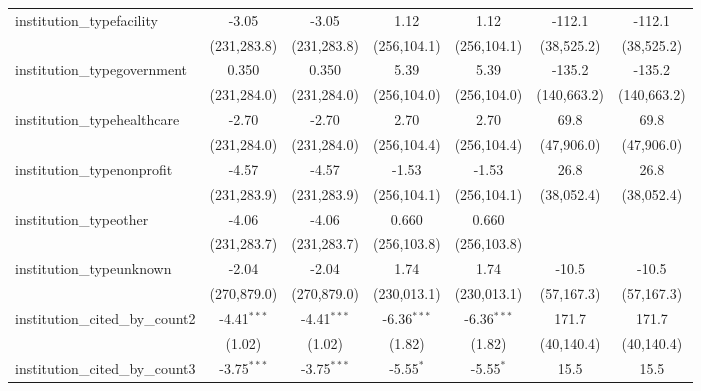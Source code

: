 \begin{tabular}{lcccccc}
   institution\_typefacility             & -3.05         & -3.05         & 1.12          & 1.12          & -112.1       & -112.1\\   
                                         & (231,283.8)   & (231,283.8)   & (256,104.1)   & (256,104.1)   & (38,525.2)   & (38,525.2)\\   
   institution\_typegovernment           & 0.350         & 0.350         & 5.39          & 5.39          & -135.2       & -135.2\\   
                                         & (231,284.0)   & (231,284.0)   & (256,104.0)   & (256,104.0)   & (140,663.2)  & (140,663.2)\\   
   institution\_typehealthcare           & -2.70         & -2.70         & 2.70          & 2.70          & 69.8         & 69.8\\   
                                         & (231,284.0)   & (231,284.0)   & (256,104.4)   & (256,104.4)   & (47,906.0)   & (47,906.0)\\   
   institution\_typenonprofit            & -4.57         & -4.57         & -1.53         & -1.53         & 26.8         & 26.8\\   
                                         & (231,283.9)   & (231,283.9)   & (256,104.1)   & (256,104.1)   & (38,052.4)   & (38,052.4)\\   
   institution\_typeother                & -4.06         & -4.06         & 0.660         & 0.660         &              &   \\   
                                         & (231,283.7)   & (231,283.7)   & (256,103.8)   & (256,103.8)   &              &   \\   
   institution\_typeunknown              & -2.04         & -2.04         & 1.74          & 1.74          & -10.5        & -10.5\\   
                                         & (270,879.0)   & (270,879.0)   & (230,013.1)   & (230,013.1)   & (57,167.3)   & (57,167.3)\\   
   institution\_cited\_by\_count2        & -4.41$^{***}$ & -4.41$^{***}$ & -6.36$^{***}$ & -6.36$^{***}$ & 171.7        & 171.7\\   
                                         & (1.02)        & (1.02)        & (1.82)        & (1.82)        & (40,140.4)   & (40,140.4)\\   
   institution\_cited\_by\_count3        & -3.75$^{***}$ & -3.75$^{***}$ & -5.55$^{*}$   & -5.55$^{*}$   & 15.5         & 15.5\\   

\end{tabular}

